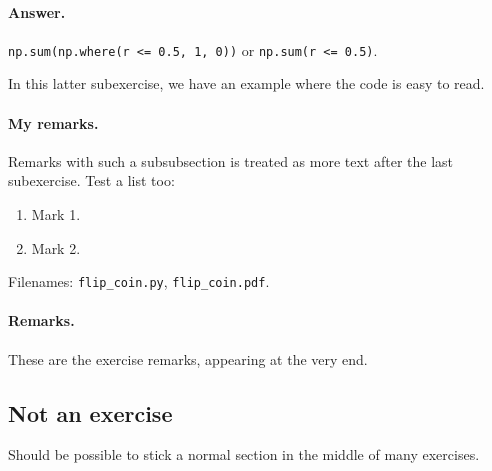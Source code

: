 \n\documentclass[%
oneside,                 %
final,                   %
10pt]{article}
\newenvironment{doconceexercise}{}{}
\newcounter{doconceexercisecounter}
\theoremstyle{definition}
\begin{document}
\begin{enumerate}
\begin{doconceexercise}
\paragraph{Answer.}
\texttt{np.sum(np.where(r <= 0.5, 1, 0))} or \texttt{np.sum(r <= 0.5)}.

In this latter subexercise, we have an
example where the code is easy to read.

\paragraph{My remarks.}
Remarks with such a subsubsection is treated as more text
after the last subexercise. Test a list too:

\begin{enumerate}
\item Mark 1.

\item Mark 2.
\end{enumerate}

\noindent

\noindent Filenames: \Verb!flip_coin.py!, \Verb!flip_coin.pdf!.


\paragraph{Remarks.}
These are the exercise remarks, appearing at the very end.


\end{doconceexercise}

\subsection{Not an exercise}

Should be possible to stick a normal section in the middle of many
exercises.

\begin{doconceexercise}

                             
\label{my:exer1}


\end{doconceexercise}
\end{enumerate}
\end{document}

